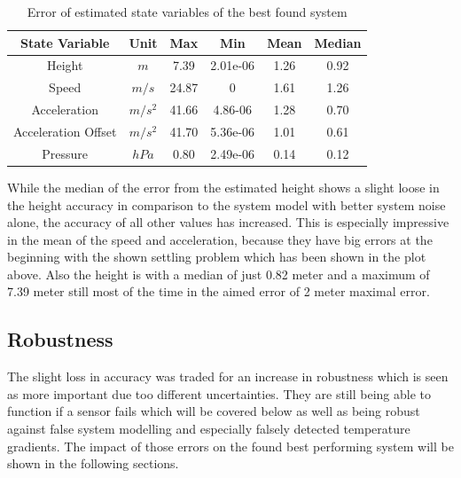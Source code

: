 \begin{table}[h!]
\centering
\begin{tabular}{cccccc}
\hline
\multicolumn{1}{|c|}{State Variable} & \multicolumn{1}{c|}{Unit} & \multicolumn{1}{c|}{Max} & \multicolumn{1}{c|}{Min} & \multicolumn{1}{c|}{Mean} & \multicolumn{1}{c|}{Median} \\ \hline
Height                            & $m$                         & 7.39	                  & 2.01e-06                 & 1.26                    & 0.92                      \\
Speed                             & $m/s$                       & 24.87                   & 0                        & 1.61                    & 1.26                      \\
Acceleration                       & $m/s^2$   			& 41.66                   & 4.86-06                  & 1.28                    & 0.70                     \\
Acceleration Offset                & $m/s^2$   			& 41.70                   & 5.36e-06                 & 1.01                    & 0.61                     \\
Pressure		          & $hPa$   			& 0.80                    & 2.49e-06                 & 0.14                    & 0.12
\end{tabular}
\caption{Error of estimated state variables of the best found system}
\label{tab:ErrorBestPerformanceSystem}
\end{table}

While the median of the error from the estimated height shows a slight loose in the height accuracy in comparison to the system model with better system noise alone,
the accuracy of all other values has increased.
This is especially impressive in the mean of the speed and acceleration, because they have big errors at the beginning with the shown settling problem which has been shown in the plot above.
Also the height is with a median of just 0.82 meter and a maximum of 7.39 meter still most of the time in the aimed error of 2 meter maximal error.

\subsection{Robustness}
The slight loss in accuracy was traded for an increase in robustness which is seen as more important due too different uncertainties.
They are still being able to function if a sensor fails which will be covered below as well as being robust against false system modelling
and especially falsely detected temperature gradients. The impact of those errors on the found best performing system will be shown in the following sections.

